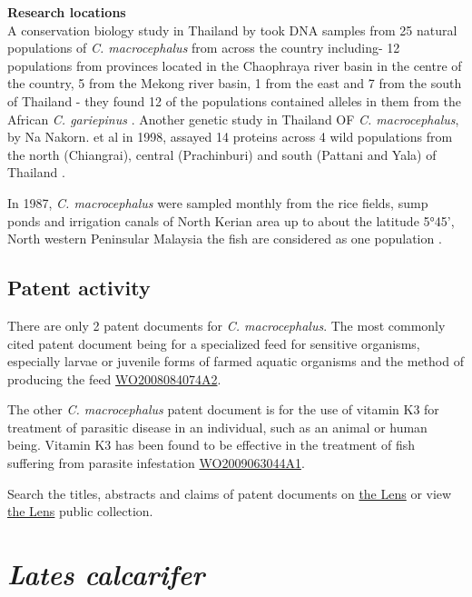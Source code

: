 \documentclass[openany]{book}
\theoremstyle{definition}
\theoremstyle{definition}
\theoremstyle{definition}
\theoremstyle{remark}
\begin{document}
\textbf{Research locations}\\
A conservation biology study in Thailand by \citet{Na_Nakorn_2004} took
DNA samples from 25 natural populations of \emph{C. macrocephalus} from
across the country including- 12 populations from provinces located in
the Chaophraya river basin in the centre of the country, 5 from the
Mekong river basin, 1 from the east and 7 from the south of Thailand -
they found 12 of the populations contained alleles in them from the
African \emph{C. gariepinus} \citep{Na_Nakorn_2004}. Another genetic
study in Thailand OF \emph{C. macrocephalus}, by Na Nakorn. et al in
1998, assayed 14 proteins across 4 wild populations from the north
(Chiangrai), central (Prachinburi) and south (Pattani and Yala) of
Thailand \citep{Na_Nakorn_1998}.

In 1987, \emph{C. macrocephalus} were sampled monthly from the rice
fields, sump ponds and irrigation canals of North Kerian area up to
about the latitude 5°45', North western Peninsular Malaysia the fish are
considered as one population \citep{Ali_1993}.

\hypertarget{patent-activity}{%
\subsection{Patent activity}\label{patent-activity}}

There are only 2 patent documents for \emph{C. macrocephalus}. The most
commonly cited patent document being for a specialized feed for
sensitive organisms, especially larvae or juvenile forms of farmed
aquatic organisms and the method of producing the feed
\href{https://www.lens.org/lens/patent/WO_2008_084074_A2}{WO2008084074A2}.

The other \emph{C. macrocephalus} patent document is for the use of
vitamin K3 for treatment of parasitic disease in an individual, such as
an animal or human being. Vitamin K3 has been found to be effective in
the treatment of fish suffering from parasite infestation
\href{https://www.lens.org/lens/patent/WO_2009_063044_A1}{WO2009063044A1}.

Search the titles, abstracts and claims of patent documents on
\href{https://www.lens.org/lens/search?q=title:(\%22Clarias\%20macrocephalus\%22)\%20OR\%20abstract:(\%22Clarias\%20macrocephalus\%22)\%20OR\%20claims:(\%22Clarias\%20macrocephalus\%22)\&l=en\&preview=true}{the
Lens} or view \href{https://www.lens.org/lens/collection/167170}{the
Lens} public collection.

\hypertarget{lates-calcarifer}{%
\section{\texorpdfstring{\emph{Lates
calcarifer}}{Lates calcarifer}}\label{lates-calcarifer}}
\end{document}
